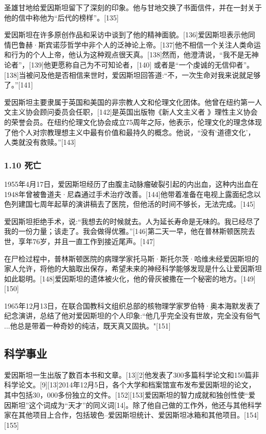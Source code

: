 圣雄甘地给爱因斯坦留下了深刻的印象。他与甘地交换了书面信件，并在一封关于他的信中称他为“后代的榜样”。[135]

爱因斯坦在许多原创作品和采访中谈到了他的精神面貌。[136]爱因斯坦表示他同情巴鲁赫·斯宾诺莎哲学中非个人的泛神论上帝。[137]他不相信一个关注人类命运和行为的个人上帝，他认为这种观点很天真。[138]然而，他澄清说，“我不是无神论者”，[139]他更愿称自己为不可知论者，[140] 或者是“一个虔诚的无信仰者”。[138]当被问及他是否相信来世时，爱因斯坦回答道:“不，一次生命对我来说就足够了。”[141]

爱因斯坦主要隶属于英国和美国的非宗教人文和伦理文化团体。他曾在纽约第一人文主义协会顾问委员会任职，[142]是英国出版物《新人文主义者 》理性主义协会的荣誉会员。在纽约伦理文化协会成立75周年之际，他表示，伦理文化的理念体现了他个人对宗教理想主义中最有价值和最持久的概念。他说，“没有‘道德文化’，人类就没有救赎。”[143]

\subsubsection{1.10 死亡}
1955年4月17日，爱因斯坦经历了由腹主动脉瘤破裂引起的内出血，这种内出血在1948年曾被鲁道夫·尼森通过手术治疗改善。[144]他带着准备在电视上露面纪念以色列建国七周年起草的演讲稿去了医院，但他活的时间不够长，无法完成。[145]

爱因斯坦拒绝手术，说:“我想去的时候就去。人为延长寿命是无味的。我已经尽了我的一份力量；该走了。我会做得优雅。”[146]第二天一早，他在普林斯顿医院去世，享年76岁，并且一直工作到接近尾声。[147]

在尸检过程中，普林斯顿医院的病理学家托马斯·斯托尔茨·哈维未经爱因斯坦的家人允许，将他的大脑取出保存，希望未来的神经科学能够发现是什么让爱因斯坦如此聪明。[148]爱因斯坦的遗体被火化，他的骨灰被撒在一个秘密的地方。[149][150]

1965年12月13日，在联合国教科文组织总部的核物理学家罗伯特·奥本海默发表了纪念演讲，总结了他对爱因斯坦的个人印象:“他几乎完全没有世故，完全没有俗气 ...他总是带着一种奇妙的纯洁，既天真又固执。"[151]

\subsection{科学事业}
爱因斯坦一生出版了数百本书和文章。[13][2]他发表了300多篇科学论文和150篇非科学论文。[9][13]2014年12月5日，各个大学和档案馆宣布发布爱因斯坦的论文，其中包括30，000多份独立的文件。[152][153]爱因斯坦的智力成就和独创性使“爱因斯坦”这个词成为“天才”的同义词[14]。除了他自己做的工作外，他还与其他科学家在其他项目上合作，包括玻色–爱因斯坦统计、爱因斯坦冰箱和其他项目。[154][155]

